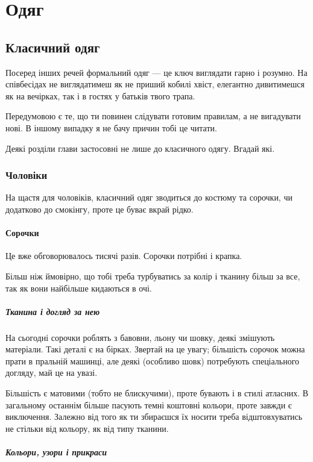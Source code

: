\part{Одяг}
\chapter{Класичний одяг}
Посеред інших речей формальний одяг — це ключ виглядати гарно і розумно. На
співбесідах не виглядатимеш як не приший кобилі хвіст, елегантно дивитимешся
як на вечірках, так і в гостях у батьків твого трапа.

Передумовою є те, що ти повинен слідувати готовим правилам, а не вигадувати
нові. В іншому випадку я не бачу причин тобі це читати.

Деякі розділи глави застосовні не лише до класичного одягу. Вгадай які.

\section{Чоловіки}
На щастя для чоловіків, класичний одяг зводиться до костюму та сорочки, чи
додатково до смокінгу, проте це буває вкрай рідко.

\subsection{Сорочки}
Це вже обговорювалось тисячі разів. Сорочки потрібні і крапка.

Більш ніж ймовірно, що тобі треба турбуватись за колір і тканину більш за все,
так як вони найбільше кидаються в очі.

\subsubsection{Тканина і догляд за нею}
На сьогодні сорочки роблять з бавовни, льону чи шовку, деякі змішують
матеріали. Такі деталі є на бірках. Звертай на це увагу; більшість сорочок
можна прати в пральній машинці, але деякі (особливо шовк) потребують
спеціального догляду, май це на увазі.

Більшість є матовими (тобто не блискучими), проте бувають і в стилі атласних.
В загальному останнім більше пасують темні коштовні кольори, проте завжди є
виключення. Залежно від того як ти збираєшся їх носити треба відштовхуватись не
стільки від кольору, як від типу тканини.

\subsubsection{Кольори, узори і прикраси}
